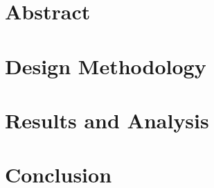 \documentclass[CMPE]{../KGCOEReport}
\begin{document}
\maketitle

\section*{Abstract}

\section*{Design Methodology}

\section*{Results and Analysis}

\section*{Conclusion}

\newpage

\end{document}
